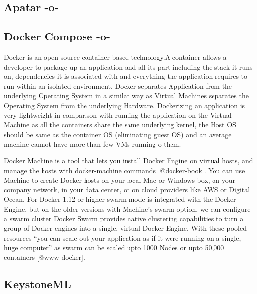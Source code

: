 \subsection{Apatar -o-}



\subsection{Docker Compose -o-}

Docker is an open-source container based technology.A container allows
a developer to package up an application and all its part including
the stack it runs on, dependencies it is associated with and
everything the application requires to run within an isolated
environment. Docker separates Application from the underlying
Operating System in a similar way as Virtual Machines separates the
Operating System from the underlying Hardware. Dockerizing an
application is very lightweight in comparison with running the
application on the Virtual Machine as all the containers share the
same underlying kernel, the Host OS should be same as the container OS
(eliminating guest OS) and an average machine cannot have more than
few VMs running o them.

Docker Machine is a tool that lets you install Docker Engine on
virtual hosts, and manage the hosts with docker-machine commands
[@docker-book]. You can use Machine to create Docker hosts on
your local Mac or Windows box, on your company network, in your data
center, or on cloud providers like AWS or Digital Ocean. For Docker
1.12 or higher swarm mode is integrated with the Docker Engine, but on
the older versions with Machine's swarm option, we can configure a
swarm cluster Docker Swarm provides native clustering capabilities to
turn a group of Docker engines into a single, virtual Docker
Engine. With these pooled resources ``you can scale out your
application as if it were running on a single, huge computer'' as
swarm can be scaled upto 1000 Nodes or upto 50,000 containers
[@www-docker].


    
\subsection{KeystoneML}
    
